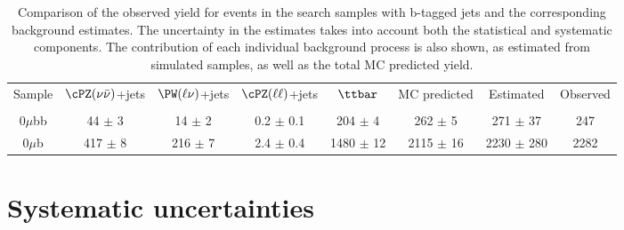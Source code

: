 {{{%

\begin{table}[h!]
  \caption{ Comparison of the observed yield for
    events in the search samples
    with b-tagged jets and the corresponding background
    estimates. The uncertainty in the estimates takes into account
    both the statistical and systematic components. The contribution of each individual background process is also shown, as 
estimated from simulated samples, as well as the total MC predicted yield.
\label{tab:bkg0muWITHB}}
\small
\centering
\begin{tabular}{|c|c|c|c|c|c|c|c|} 
  \hline
  Sample  &  $\cPZ(\nu \bar \nu)$+jets  &  $\PW(\ell \nu)$+jets  &
  $\cPZ(\ell \ell)$+jets  &  $\ttbar$  & MC predicted& Estimated &  Observed \\
&&&&& && \\
\hline
  $0\mu$bb  &  44 $\pm$ 3  &  14 $\pm$ 2  &  0.2 $\pm$ 0.1  &  204
  $\pm$ 4  & 262 $\pm$ 5 &  271 $\pm$ 37  &  247 \\ 
\hline
  $0\mu$b  &  417 $\pm$ 8  &  216 $\pm$ 7  &  2.4 $\pm$ 0.4  &  1480 $\pm$ 12  & 2115 $\pm$ 16 &  2230 $\pm$ 280  &  2282\\
\hline
\end{tabular}
\end{table}

\section{Systematic uncertainties}\label{sec:sys}

}}}
